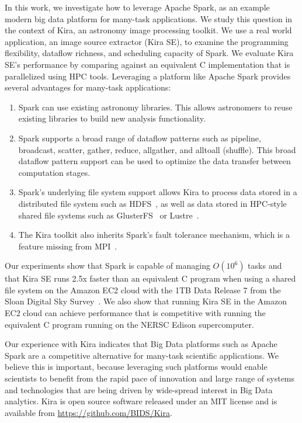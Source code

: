 \documentclass[conference]{IEEEtran}
\begin{document}
In this work, we investigate how to leverage Apache Spark,  as an example modern big data platform for many-task applications.
We study this question in the context of Kira, an astronomy image processing toolkit.
We use a real world application, an image source extractor (Kira SE), to examine the programming flexibility, dataflow richness,
and scheduling capacity of Spark. We evaluate Kira SE's performance by comparing against
an equivalent C implementation that is parallelized using HPC tools. Leveraging a platform like Apache Spark provides several advantages for many-task applications:
\begin{enumerate}
\item Spark can use existing astronomy libraries.
This allows astronomers to reuse existing libraries to build new analysis functionality.
\item Spark supports a broad range of dataflow patterns such as pipeline, broadcast, scatter, gather, reduce, allgather, 
and alltoall (shuffle). This broad dataflow pattern support can be used to optimize the data transfer between computation stages.
\item Spark's underlying file system support allows Kira to process data stored in a distributed file system such as HDFS~\cite{shvachko10}, 
as well as data stored in HPC-style shared file systems such as GlusterFS~\cite{davies13} or Lustre~\cite{donovan03}.
\item The Kira toolkit also inherits Spark's fault tolerance mechanism, which is a feature missing from MPI~\cite{gropp96}.
\end{enumerate}

Our experiments show that Spark is capable of managing $O(10^6)$ tasks and that Kira SE runs 2.5x faster than an equivalent C program when using a shared file system on the Amazon EC2 cloud with the 1TB Data Release 7 from the Sloan Digital Sky Survey~\cite{york00}. We also show that running Kira SE in the Amazon EC2 cloud can achieve performance that is competitive with running the equivalent C program running on the NERSC Edison supercomputer.

\newpage
Our experience with Kira indicates that Big Data platforms such as Apache Spark are a competitive alternative for many-task scientific applications.   
We believe this is important, because leveraging such platforms would enable scientists to benefit from the rapid pace of innovation and large range of systems and technologies that are being driven by wide-spread interest in Big Data analytics.
Kira is open source software released under an MIT license and is available from \linebreak \url{https://github.com/BIDS/Kira}.
\end{document}
